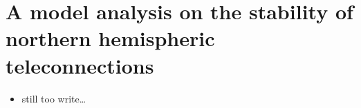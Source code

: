
\chapter{A model analysis on the stability of northern hemispheric teleconnections}

\label{chp:teles}


\begin{itemize}
	\item still too write\ldots
\end{itemize}
